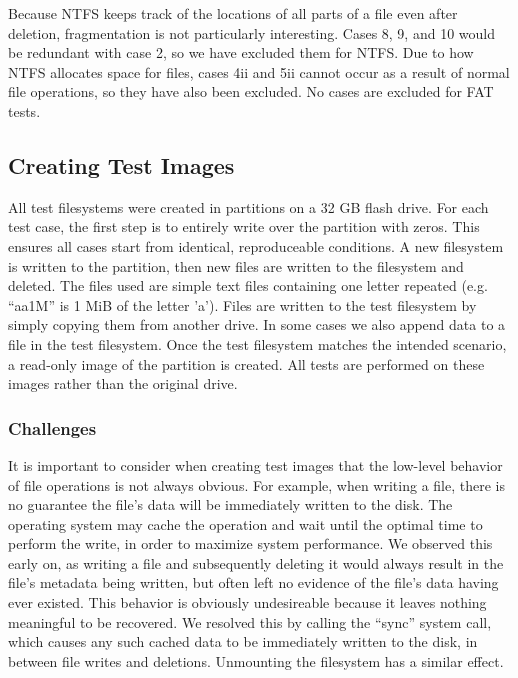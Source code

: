 Because NTFS keeps track of the locations of all parts of a file even after deletion, fragmentation is not particularly interesting. Cases 8, 9, and 10 would be redundant with case 2, so we have excluded them for NTFS. Due to how NTFS allocates space for files, cases 4ii and 5ii cannot occur as a result of normal file operations, so they have also been excluded. No cases are excluded for FAT tests.

\subsection{Creating Test Images}
All test filesystems were created in partitions on a 32 GB flash drive. For each test case, the first step is to entirely write over the partition with zeros. This ensures all cases start from identical, reproduceable conditions. A new filesystem is written to the partition, then new files are written to the filesystem and deleted. The files used are simple text files containing one letter repeated (e.g. ``aa1M'' is 1 MiB of the letter 'a'). Files are written to the test filesystem by simply copying them from another drive. In some cases we also append data to a file in the test filesystem. Once the test filesystem matches the intended scenario, a read-only image of the partition is created. All tests are performed on these images rather than the original drive.

\subsubsection{Challenges}
It is important to consider when creating test images that the low-level behavior of file operations is not always obvious. For example, when writing a file, there is no guarantee the file's data will be immediately written to the disk. The operating system may cache the operation and wait until the optimal time to perform the write, in order to maximize system performance. We observed this early on, as writing a file and subsequently deleting it would always result in the file's metadata being written, but often left no evidence of the file's data having ever existed. This behavior is obviously undesireable because it leaves nothing meaningful to be recovered. We resolved this by calling the ``sync'' system call, which causes any such cached data to be immediately written to the disk, in between file writes and deletions. Unmounting the filesystem has a similar effect.

